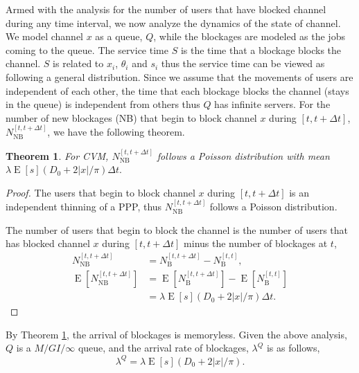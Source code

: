 \documentclass[10pt, conference, letterpaper]{IEEEtran}
\newtheorem{theorem}{Theorem}
\DeclareMathOperator*{\E}{\mathrm{E}}
\begin{document}
Armed with the analysis for the number of users that have blocked channel during any time interval, we now analyze the dynamics of the state of channel. 
We model channel $x$ as a queue, $Q$, while the blockages are modeled as the jobs coming to the queue. 
The service time $S$ is the time that a blockage blocks the channel. $S$ is related to $x_i$, $\theta_i$ and $s_i$ thus the service time can be viewed as following a general distribution. 
Since we assume that the movements of users are independent of each other, the time that each blockage blocks the channel (stays in the queue) is independent from others thus $Q$ has infinite servers. 
For the number of new blockages (NB) that begin to block channel $x$ during $[t, t+\Delta t]$, $N_{\mathrm{NB}}^{[t, t+\Delta t]}$, we have the following theorem.

\begin{theorem}\label{theorem:poisson_arrival}
For CVM, $N_{\mathrm{NB}}^{[t, t+\Delta t]}$ follows a Poisson distribution with mean $\lambda\E[s](D_0 + 2|x|/\pi)\Delta t.$
\end{theorem}
\begin{proof}
The users that begin to block channel $x$ during $[t, t+\Delta t]$ is an independent thinning of a PPP, thus $N_{\mathrm{NB}}^{[t, t+\Delta t]}$ follows a Poisson distribution. 

The number of users that begin to block the channel is the number of users that has blocked channel $x$ during $[t, t+\Delta t]$ minus the number of blockages at $t$,  
\begin{equation*}
\begin{aligned}
N_{\mathrm{NB}}^{[t, t+\Delta t]} & = N_\mathrm{B}^{[t, t+\Delta t]} - N_\mathrm{B}^{[t, t]}, \\
\E[N_{\mathrm{NB}}^{[t, t+\Delta t]}] & = \E[N_\mathrm{B}^{[t, t+\Delta t]}] - \E[N_\mathrm{B}^{[t, t]}] \\
									  & = \lambda\E[s](D_0 + 2|x|/\pi)\Delta t.
\end{aligned}
\end{equation*}
\end{proof}

By Theorem \ref{theorem:poisson_arrival}, the arrival of blockages is memoryless.  Given the above analysis, $Q$ is a $M/GI/\infty$ queue,  and the arrival rate of blockages, $\lambda^Q$ is as follows,
\begin{equation}\label{eq:lambda_queue}
\lambda^Q = \lambda\E[s](D_0 + 2|x|/\pi).
\end{equation} 
\end{document}
